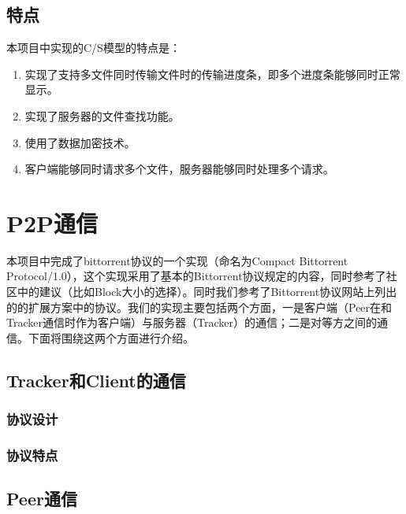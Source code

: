\documentclass[15pt]{ctexart}
\begin{document}
\subsection{特点} %
\label{sub:特点}
本项目中实现的C/S模型的特点是：
\begin{enumerate}
	\item 实现了支持多文件同时传输文件时的传输进度条，即多个进度条能够同时正常显示。
	\item 实现了服务器的文件查找功能。
	\item 使用了数据加密技术。
	\item 客户端能够同时请求多个文件，服务器能够同时处理多个请求。
\end{enumerate}


\section{P2P通信} %
\label{sec:p2p通信}
	本项目中完成了bittorrent协议的一个实现（命名为Compact Bittorrent Protocol/1.0），这个实现采用了基本的Bittorrent协议规定的内容，同时参考了社区中的建议（比如Block大小的选择）。同时我们参考了Bittorrent协议网站上列出的的扩展方案中的协议。我们的实现主要包括两个方面，一是客户端（Peer在和Tracker通信时作为客户端）与服务器（Tracker）的通信；二是对等方之间的通信。下面将围绕这两个方面进行介绍。
	\subsection{Tracker和Client的通信} %
	\label{sub:tracker_和_client}

		\subsubsection{协议设计} %
		\label{ssub:协议设计}
		
		\subsubsection{协议特点} %
		\label{ssub:协议特点}
		
	\subsection{Peer通信} %
	\label{sub:peer通信}
	
\end{document}
